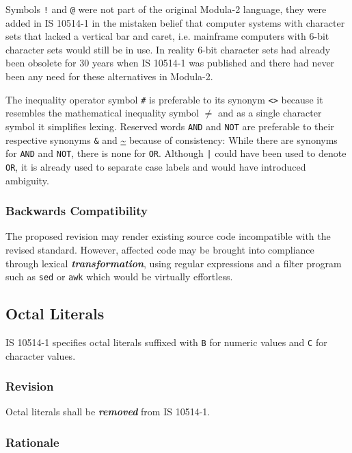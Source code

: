 \documentclass[10pt,a4paper,leqno,fleqn]{article}
\renewcommand{\emph}[1]{\textbf{\textit{#1}}}
\begin{document}
Symbols \verb|!| and \verb|@| were not part of the original Modula-2 language,
they were added in IS 10514-1 in the mistaken belief that computer systems
with character sets that lacked a vertical bar and caret, i.e. mainframe computers
with 6-bit character sets would still be in use. In reality 6-bit character sets had
already been obsolete for 30 years when IS 10514-1 was published and there
had never been any need for these alternatives in Modula-2.

The inequality operator symbol \verb|#| is preferable to its synonym \verb|<>|
because it resembles the mathematical inequality symbol \footnotesize
\raisebox{0.35ex} {$\neq$} \normalsize and as a single character symbol it 
simplifies lexing. Reserved words \verb|AND| and \verb|NOT| are preferable to
their respective synonyms \verb|&| and \url{~} because of consistency: While
there are synonyms for \verb|AND| and \verb|NOT|, there is none for \verb|OR|.
Although \verb!|! could have been used to denote \verb|OR|, it is already used
to separate case labels and would have introduced ambiguity.

\subsubsection{Backwards Compatibility}

The proposed revision may render existing source code incompatible with the
revised standard. However, affected code may be brought into compliance through
lexical \emph{transformation}, using regular expressions and a filter program such
as \verb|sed| or \verb|awk| which would be virtually effortless.


\subsection{Octal Literals}

IS 10514-1 specifies octal literals suffixed with \verb|B| for numeric values
and \verb|C| for character values.

\subsubsection{Revision}
Octal literals shall be \emph{removed} from IS 10514-1.

\subsubsection{Rationale}
\end{document}
